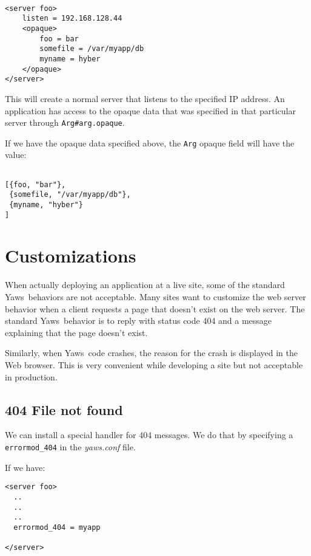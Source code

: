 \documentclass[11pt,oneside,english]{book}
\newcommand{\Yaws}            %
        {{\sc Yaws}}
\begin{document}
\begin{verbatim}

<server foo>
    listen = 192.168.128.44
    <opaque>
        foo = bar
        somefile = /var/myapp/db
        myname = hyber
    </opaque>
</server>
\end{verbatim}

This will create a normal server that listens to the specified IP address.
An application has access to the opaque data that was specified
in that particular server through \verb+Arg#arg.opaque+.

If we have the opaque data specified above, the \verb+Arg+ opaque
field will have the value:

\begin{verbatim}

[{foo, "bar"},
 {somefile, "/var/myapp/db"},
 {myname, "hyber"}
]

\end{verbatim}


\section{Customizations}

When actually deploying an application at a live site, some of the
standard \Yaws\ behaviors are not acceptable. Many sites want to
customize the web server behavior when a client requests a page that
doesn't exist on the web server. The standard \Yaws\ behavior is to
reply with status code 404 and a message explaining that the page
doesn't exist.

Similarly, when \Yaws\  code crashes, the reason for the crash is
displayed in the Web browser. This is very convenient while
developing a site but not acceptable in production.


\subsection{404 File not found}

We can install a special handler for 404 messages. We do that by
specifying a \verb+errormod_404+ in the \textit{yaws.conf} file.

If we have:

\begin{verbatim}
<server foo>
  ..
  ..
  ..
  errormod_404 = myapp

</server>

\end{verbatim}
\end{document}
